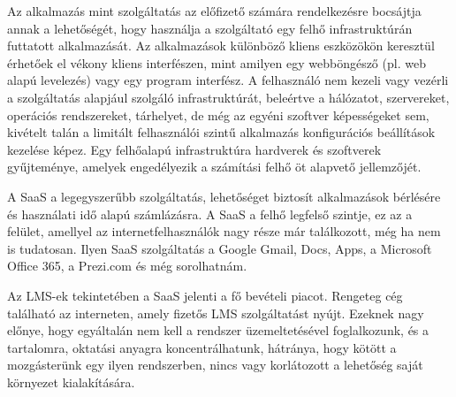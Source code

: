Az alkalmazás mint szolgáltatás az előfizető számára rendelkezésre bocsájtja annak a lehetőségét, hogy használja a szolgáltató egy felhő infrastruktúrán futtatott alkalmazását. Az alkalmazások különböző kliens eszközökön keresztül érhetőek el vékony kliens interfészen, mint amilyen egy webböngésző (pl. web alapú levelezés) vagy egy program interfész. A felhasználó nem kezeli vagy vezérli a szolgáltatás alapjául szolgáló infrastruktúrát, beleértve a hálózatot, szervereket, operációs rendszereket, tárhelyet, de még az egyéni szoftver képességeket sem, kivételt talán a limitált felhasználói szintű alkalmazás konfigurációs beállítások kezelése képez. Egy felhőalapú infrastruktúra hardverek és szoftverek gyűjteménye, amelyek engedélyezik a számítási felhő öt alapvető jellemzőjét.

A SaaS a legegyszerűbb szolgáltatás, lehetőséget biztosít alkalmazások bérlésére és használati idő alapú számlázásra\cite{ccwlinux}. A SaaS a felhő legfelső szintje, ez az a felület, amellyel az internetfelhasználók nagy része már találkozott, még ha nem is tudatosan. Ilyen SaaS szolgáltatás a Google Gmail, Docs, Apps, a Microsoft Office 365, a Prezi.com és még sorolhatnám.

Az LMS-ek tekintetében a SaaS jelenti a fő bevételi piacot. Rengeteg cég található az interneten, amely fizetős LMS szolgáltatást nyújt. Ezeknek nagy előnye, hogy egyáltalán nem kell a rendszer üzemeltetésével foglalkozunk, és a tartalomra, oktatási anyagra koncentrálhatunk, hátránya, hogy kötött a mozgásterünk egy ilyen rendszerben, nincs vagy korlátozott a lehetőség saját környezet kialakítására.

